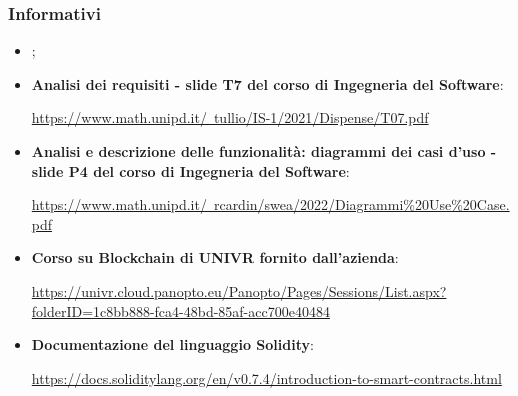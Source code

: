 \subsubsection{Informativi}
\begin{itemize}
    \item \textbf{\docNameVersionPdP{}};
    \item \textbf{Analisi dei requisiti - slide T7 del corso di Ingegneria del Software}:
          \begin{center}
              \href{https://www.math.unipd.it/~tullio/IS-1/2021/Dispense/T07.pdf}{https://www.math.unipd.it/~tullio/IS-1/2021/Dispense/T07.pdf}
          \end{center}
    \item \textbf{Analisi e descrizione delle funzionalità: diagrammi dei casi d'uso - slide P4 del corso di Ingegneria del Software}:
          \begin{center}
              \href{https://www.math.unipd.it/~rcardin/swea/2022/Diagrammi%20Use%20Case.pdf}{https://www.math.unipd.it/~rcardin/swea/2022/Diagrammi\%20Use\%20Case.pdf}
          \end{center}
    \item \textbf{Corso su Blockchain di UNIVR fornito dall'azienda}:
          \begin{center}
              \href{https://univr.cloud.panopto.eu/Panopto/Pages/Sessions/List.aspx?folderID=1c8bb888-fca4-48bd-85af-acc700e40484}{https://univr.cloud.panopto.eu/Panopto/Pages/Sessions/List.aspx?folderID=1c8bb888-fca4-48bd-85af-acc700e40484}
          \end{center}
    \item \textbf{Documentazione del linguaggio Solidity\glo{}}:
          \begin{center}
              \href{https://docs.soliditylang.org/en/v0.7.4/introduction-to-smart-contracts.html}{https://docs.soliditylang.org/en/v0.7.4/introduction-to-smart-contracts.html}
          \end{center}
\end{itemize}

\clearpage



